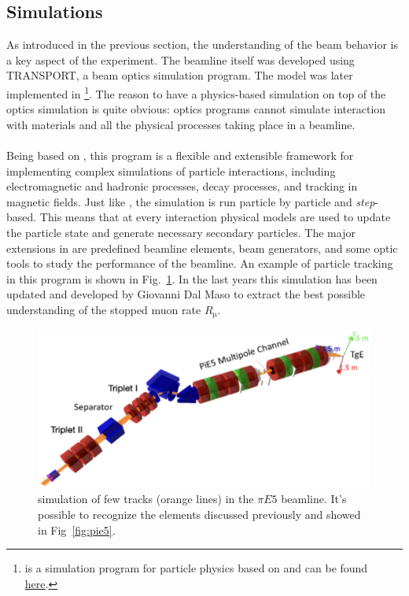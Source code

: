\begin{refsection}
    \subsection{Simulations}
        As introduced in the previous section, the understanding of the beam behavior is a key aspect of the experiment.
        The beamline itself was developed using TRANSPORT, a beam optics simulation program.
        The model was later implemented in \gfb\footnote{\gfb is a simulation program for particle physics based on \gf and can be found \href{https://www.muonsinc.com/Website1/G4beamline}{\underline{here}}.}.
        The reason to have a physics-based simulation on top of the optics simulation is quite obvious: optics programs cannot simulate interaction with materials and all the physical processes taking place in a beamline.

        
        \paragraph{\gfb} Being based on \gf, this program is a flexible and extensible framework for implementing complex simulations of particle interactions, including electromagnetic and hadronic processes, decay processes, and tracking in magnetic fields.
        Just like \gf, the simulation is run particle by particle and \textit{step}-based.
        This means that at every interaction physical models are used to update the particle state and generate necessary secondary particles.
        The major extensions in \gfb are predefined beamline elements, beam generators, and some optic tools to study the performance of the beamline.
        An example of particle tracking in this program is shown in Fig.~\ref{fig:piE5_gfb}.
        In the last years this simulation has been updated and developed by Giovanni Dal Maso to extract the best possible understanding of the stopped muon rate $R_\upmu$. 

        \begin{figure}
            \centering
            \includegraphics[width = \textwidth]{Figures/MEG/piE5_gfb.png}
            \caption{\gfb simulation of few tracks (orange lines) in the $\pi E5$ beamline. It's possible to recognize the elements discussed previously and showed in Fig~\ref{fig:pie5}.}
            \label{fig:piE5_gfb}
        \end{figure}
        

\end{refsection}
